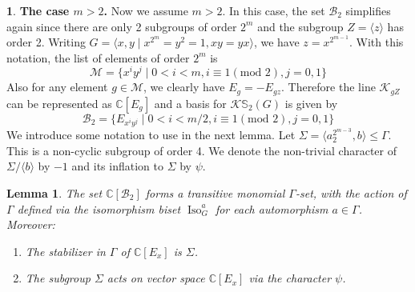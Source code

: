 \documentclass[12pt]{article}
\theoremstyle{plain}
\newtheorem{lemma}[theorem]{Lemma}
\theoremstyle{definition}
\newtheorem{nothing}[theorem]{}
\newcommand{\kerlint}{\mathbb S_2}
\begin{document}
\begin{nothing} {\bf The case $m>2$.}
Now we assume $m>2$. In this case, the set $\mathcal B_2$ simplifies again since there are only 2 subgroups of order $2^m$ and the subgroup $Z=\langle z\rangle$ has order 2. Writing $G = \langle x, y\mid x^{2^m} = y^2 = 1, xy = yx\rangle$, we have $z= x^{2^{m-1}}$. With this notation, the list of elements of order $2^m$ is
\[
\mathcal M= \{ x^iy^j\mid 0<i< m, i\equiv 1 (\text{mod }2), j= 0,1 \}
\]
Also for any element $g\in\mathcal M$, we clearly have $E_g = -E_{gz}$. Therefore the line $\mathcal K_{gZ}$ can be represented as $\mathbb C[E_g]$ and a basis for $\mathcal K\kerlint(G)$ is given by 
\[
\mathcal B_2= \{ E_{x^iy^j}\mid 0<i<m/2 , i\equiv 1 (\text{mod }2), j= 0,1 \}
\]
We introduce some notation to use in the next lemma. Let $\Sigma = \langle a_2^{2^{m-3}}, b \rangle\le \Gamma$. This is a non-cyclic subgroup of order 4. We denote the non-trivial character of $\Sigma/\langle b\rangle$ by $-1$ and its inflation to $\Sigma$ by $\psi$.  
\end{nothing}
\begin{lemma}
The set \(\mathbb{C}[\mathcal{B}_2]\) forms a transitive monomial \(\Gamma\)-set, with the action of \(\Gamma\) defined via the isomorphism biset \(\operatorname{Iso}_G^a\) for each automorphism \(a \in \Gamma\). Moreover:
\begin{enumerate}
    \item[\textbf{(a)}] The stabilizer in \(\Gamma\) of \(\mathbb{C}[E_x]\) is \(\Sigma\).
    \item[\textbf{(b)}] The subgroup \(\Sigma\) acts on vector space \(\mathbb{C}[E_x]\) via the character \(\psi\).
\end{enumerate}
\end{lemma}
\end{document}
